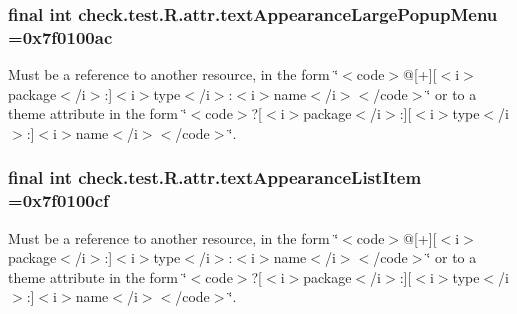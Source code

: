 \subsubsection[{text\+Appearance\+Large\+Popup\+Menu}]{\setlength{\rightskip}{0pt plus 5cm}final int check.\+test.\+R.\+attr.\+text\+Appearance\+Large\+Popup\+Menu =0x7f0100ac\hspace{0.3cm}{\ttfamily [static]}}\label{classcheck_1_1test_1_1_r_1_1attr_a378cf97243180991de45fbf2a470b74f}
Must be a reference to another resource, in the form \char`\"{}$<$code$>$@\mbox{[}+\mbox{]}\mbox{[}$<$i$>$package$<$/i$>$\+:\mbox{]}$<$i$>$type$<$/i$>$\+:$<$i$>$name$<$/i$>$$<$/code$>$\char`\"{} or to a theme attribute in the form \char`\"{}$<$code$>$?\mbox{[}$<$i$>$package$<$/i$>$\+:\mbox{]}\mbox{[}$<$i$>$type$<$/i$>$\+:\mbox{]}$<$i$>$name$<$/i$>$$<$/code$>$\char`\"{}. \hypertarget{classcheck_1_1test_1_1_r_1_1attr_a0903b5738e5ebb9f752a3eeb9edb6438}{}
\subsubsection[{text\+Appearance\+List\+Item}]{\setlength{\rightskip}{0pt plus 5cm}final int check.\+test.\+R.\+attr.\+text\+Appearance\+List\+Item =0x7f0100cf\hspace{0.3cm}{\ttfamily [static]}}\label{classcheck_1_1test_1_1_r_1_1attr_a0903b5738e5ebb9f752a3eeb9edb6438}
Must be a reference to another resource, in the form \char`\"{}$<$code$>$@\mbox{[}+\mbox{]}\mbox{[}$<$i$>$package$<$/i$>$\+:\mbox{]}$<$i$>$type$<$/i$>$\+:$<$i$>$name$<$/i$>$$<$/code$>$\char`\"{} or to a theme attribute in the form \char`\"{}$<$code$>$?\mbox{[}$<$i$>$package$<$/i$>$\+:\mbox{]}\mbox{[}$<$i$>$type$<$/i$>$\+:\mbox{]}$<$i$>$name$<$/i$>$$<$/code$>$\char`\"{}. \hypertarget{classcheck_1_1test_1_1_r_1_1attr_a207e3b80940457620df45d83ed20ab6d}{}
